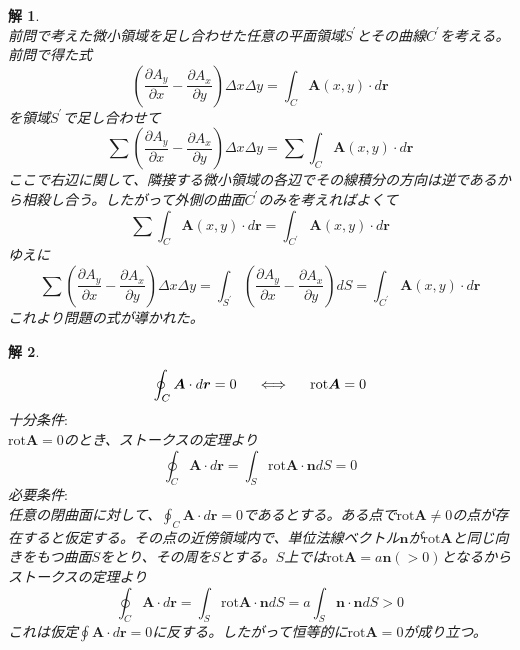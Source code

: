 \documentclass{jsarticle}
\newtheorem{ans}{解}[section]
\begin{document}
\begin{ans}~\\
前問で考えた微小領域を足し合わせた任意の平面領域\(S^{\prime}\)とその曲線\(C^{\prime}\)を考える。\\
前問で得た式
\[\left(\frac{\partial A_{y}}{\partial x}-\frac{\partial A_{x}}{\partial y}\right)\Delta x\Delta y=\int_{C}\bm{A}(x,y)\cdot d\bm{r}\]
を領域\(S^{\prime}\)で足し合わせて
\[\sum\left(\frac{\partial A_{y}}{\partial x}-\frac{\partial A_{x}}{\partial y}\right)\Delta x\Delta y=\sum\int_{C}\bm{A}(x,y)\cdot d\bm{r}\]
ここで右辺に関して、隣接する微小領域の各辺でその線積分の方向は逆であるから相殺し合う。したがって外側の曲面\(C^{\prime}\)のみを考えればよくて
\[\sum\int_{C}\bm{A}(x,y)\cdot d\bm{r}=\int_{C^{\prime}}\bm{A}(x,y)\cdot d\bm{r}\]
ゆえに
\[\sum\left(\frac{\partial A_{y}}{\partial x}-\frac{\partial A_{x}}{\partial y}\right)\Delta x\Delta y=\int_{S^{\prime}}\left(\frac{\partial A_{y}}{\partial x}-\frac{\partial A_{x}}{\partial y}\right)dS=\int_{C^{\prime}}\bm{A}(x,y)\cdot d\bm{r}\]
これより問題の式が導かれた。
\end{ans}

\begin{ans}~\\
\[\oint_{C}\bm{A}\cdot d\bm{r}=0\hspace{5mm}\Longleftrightarrow\hspace{5mm}\mathrm{rot}\bm{A}=0\]
十分条件\(:\)\\
\(\displaystyle\mathrm{rot}\bm{A}=0\)のとき、ストークスの定理より
\[\oint_{C}\bm{A}\cdot d\bm{r}=\int_{S}\mathrm{rot}\bm{A}\cdot\bm{n}dS=0\]
必要条件\(:\)\\
任意の閉曲面に対して、\(\displaystyle\oint_{C}\bm{A}\cdot d\bm{r}=0\)であるとする。ある点で\(\mathrm{rot}\bm{A}\ne0\)の点が存在すると仮定する。その点の近傍領域内で、単位法線ベクトル\(\bm{n}\)が\(\mathrm{rot}\bm{A}\)と同じ向きをもつ曲面\(S\)をとり、その周を\(S\)とする。\(S\)上では\(\mathrm{rot}\bm{A}=a\bm{n}(>0)\)となるからストークスの定理より
\[\oint_{C}\bm{A}\cdot d\bm{r}=\int_{S}\mathrm{rot}\bm{A}\cdot\bm{n}dS=a\int_{S}\bm{n}\cdot\bm{n}dS>0\]
これは仮定\(\oint\bm{A}\cdot d\bm{r}=0\)に反する。したがって恒等的に\(\mathrm{rot}\bm{A}=0\)が成り立つ。
\end{ans}
\end{document}
